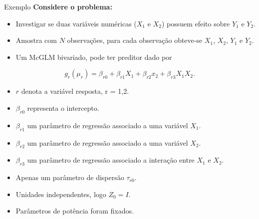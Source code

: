 \documentclass[
  ignorenonframetext,
  serif,
  professionalfont,
  usenames,
  dvipsnames,
  aspectratio = 169]{beamer}
\def\endColumns{\end{minipage}}%
\def\beginAHalfColumnT{\begin{minipage}[t]{0.49\textwidth}}%
\begin{document}
\begin{frame}{Exemplo}
\protect\hypertarget{exemplo-2}{}
\textbf{Considere o problema:}

\begin{itemize}
  
  \item Investigar se duas variáveis numéricas ($X_1$ e $X_2$) possuem efeito sobre $Y_1$ e $Y_2$.
  
  \item Amostra com $N$ observações, para cada observação obteve-se $X_1$, $X_2$, $Y_1$ e $Y_2$.

  \item Um McGLM bivariado, pode ter preditor dado por

\end{itemize}

\[
g_r(\mu_r) = \beta_{r0} + \beta_{r1} X_1 + \beta_{r2} x_2 + \beta_{r3} X_1X_2.
\] \beginAHalfColumnT

\begin{itemize}
  \itemsep 1ex
  \item $r$ denota a variável resposta, r = 1,2.
  \item $\beta_{r0}$ representa o intercepto.
  \item $\beta_{r1}$ um parâmetro de regressão associado a uma variável $X_1$. 
  \item $\beta_{r2}$ um parâmetro de regressão associado a uma variável $X_2$.
\end{itemize}  
\endColumns    
\beginAHalfColumnT

\begin{itemize}
  \itemsep 1ex
  \item $\beta_{r3}$ um parâmetro de regressão associado a interação entre $X_1$ e $X_2$. 
  \item Apenas um parâmetro de dispersão $\tau_{r0}$.
  \item Unidades independentes, logo $Z_0 = I$.
  \item Parâmetros de potência foram fixados.
\end{itemize}

\endColumns
\end{frame}
\end{document}
